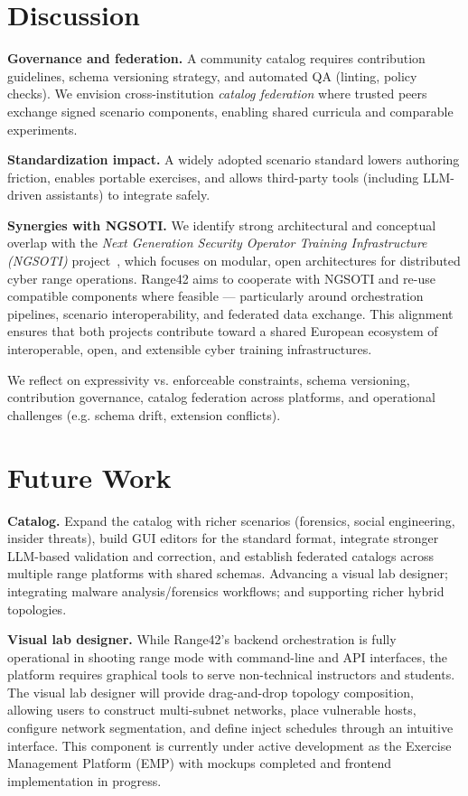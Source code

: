 \documentclass[11pt]{article}
\begin{document}
\section{Discussion}

\textbf{Governance and federation.} A community catalog requires contribution guidelines, schema versioning strategy, and automated QA (linting, policy checks).
We envision cross-institution \emph{catalog federation} where trusted peers exchange signed scenario components, enabling shared curricula and comparable experiments.

\textbf{Standardization impact.} A widely adopted scenario standard lowers authoring friction, enables portable exercises, and allows third-party tools (including LLM-driven assistants) to integrate safely.

\textbf{Synergies with NGSOTI.} 
We identify strong architectural and conceptual overlap with the \emph{Next Generation Security Operator Training Infrastructure (NGSOTI)} project~\cite{ngsoti}, 
which focuses on modular, open architectures for distributed cyber range operations. 
Range42 aims to cooperate with NGSOTI and re-use compatible components where feasible --- particularly around orchestration pipelines, scenario interoperability, and federated data exchange. 
This alignment ensures that both projects contribute toward a shared European ecosystem of interoperable, open, and extensible cyber training infrastructures.

We reflect on expressivity vs. enforceable constraints, schema versioning, contribution governance, catalog federation across platforms, and operational challenges (e.g. schema drift, extension conflicts).

\section{Future Work}

\textbf{Catalog.}
Expand the catalog with richer scenarios (forensics, social engineering, insider threats), build GUI editors for the standard format, integrate stronger LLM-based validation and correction, and establish federated catalogs across multiple range platforms with shared schemas. Advancing a visual lab designer; integrating malware analysis/forensics workflows; and supporting richer hybrid topologies.

\textbf{Visual lab designer.}
While Range42's backend orchestration is fully operational in shooting range mode with command-line and API interfaces,
the platform requires graphical tools to serve non-technical instructors and students.
The visual lab designer will provide drag-and-drop topology composition, allowing users to construct multi-subnet networks, place vulnerable hosts, configure network segmentation, and define inject schedules through an intuitive interface.
This component is currently under active development as the Exercise Management Platform (EMP) with mockups completed and frontend implementation in progress.
\end{document}
